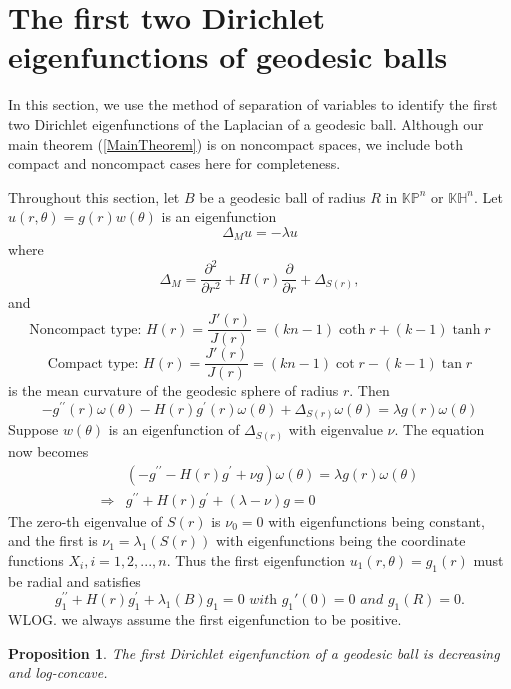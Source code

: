 \documentclass{amsart}
\numberwithin{equation}{section}
\theoremstyle{plain}
\newtheorem{prop}[theorem]{Proposition}
\theoremstyle{definition}
\theoremstyle{remark}
\def\KK {\mathbb{K}}
\def\HH {\mathbb{H}}
\def\PP {\mathbb{P}}
\begin{document}
\section{The first two Dirichlet eigenfunctions of geodesic balls}\label{Section: First two Dirichlet of balls}
In this section, we use the method of separation of variables to identify the first two Dirichlet eigenfunctions of the Laplacian of a geodesic ball. Although our main theorem (\cref{MainTheorem}) is on noncompact spaces, we include both compact and noncompact cases here for completeness. 
\par Throughout this section, let $B$ be a geodesic ball of radius $R$ in $\KK\PP^n$ or $\KK\HH^n$. Let $u(r,\theta)= g(r)w(\theta)$ is an eigenfunction
\[\Delta_M u=-\lambda u \] where \[\Delta_M=\frac{\partial^2}{\partial r^2}+H(r) \frac{\partial}{\partial r}+\Delta_{S(r)},\] and   \[\text{Noncompact type: } H(r)=\frac{J'(r)}{J(r)}=(k n-1) \operatorname{coth} r+(k-1) \tanh r \]\[\text{Compact type: } H(r)=\frac{J'(r)}{J(r)}=(k n-1) \operatorname{cot} r-(k-1) \tan r \]is the mean curvature of the geodesic sphere of radius $r$.
Then 
\[-g^{\prime \prime}(r) \omega(\theta)-H(r) g^{\prime}(r) \omega(\theta)+\Delta_{S(r)} \omega(\theta)=\lambda  g(r) \omega(\theta)\]
Suppose $w(\theta)$ is an eigenfunction of $\Delta_{S(r)}$ with eigenvalue $\nu$. The equation now becomes
\[\begin{aligned}
& \left(-g^{\prime \prime}-H(r) g^{\prime}+ \nu g\right) \omega(\theta)=\lambda  g(r) \omega(\theta) \\
 \Longrightarrow & g^{\prime \prime}+H(r) g^{\prime}+(\lambda-\nu) g=0
\end{aligned}\]
The zero-th eigenvalue of $S(r)$ is $\nu_0= 0$ with eigenfunctions being constant, and the first is $\nu_1= \lambda_1(S(r))$ with eigenfunctions being the coordinate functions $X_i, i =1,2,...,n$. Thus the first eigenfunction $u_1(r,\theta) = g_1(r)$ must be radial and satisfies
\begin{equation}\label{FirstEigenODE}
    g_1^{\prime \prime}+H(r) g_1^{\prime}+\lambda_1(B)  g_1=0 \textit{ with } g_1'(0) = 0 \textit{ and } g_1(R) = 0.
\end{equation}
WLOG. we always assume the first eigenfunction to be positive.
\begin{prop}\label{g1decreasinglogconcave}
    The first Dirichlet eigenfunction of a geodesic ball is decreasing and log-concave.
\end{prop}
\end{document}
